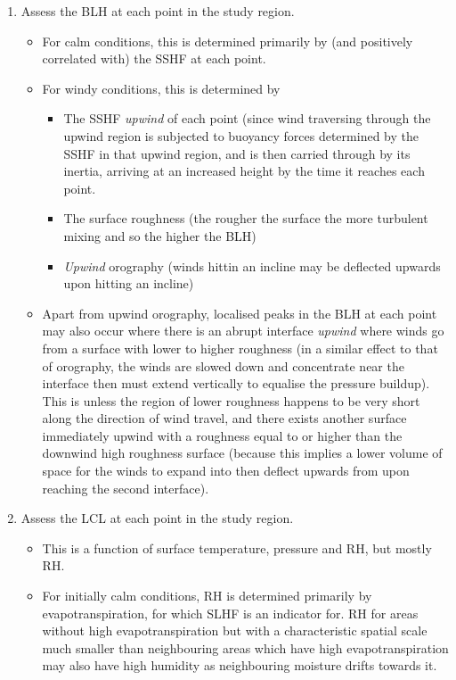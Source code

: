 \begin{enumerate}
	\item Assess the \ac{BLH} at each point in the study region.
	\begin{itemize}
		\item For calm conditions, this is determined primarily by (and positively correlated with) the \ac{SSHF} at each point.
		\item For windy conditions, this is determined by
		\begin{itemize}
			\item The \ac{SSHF} \textit{upwind} of each point (since wind traversing through the upwind region is subjected to buoyancy forces determined by the \ac{SSHF} in that upwind region, and is then carried through by its inertia, arriving at an increased height by the time it reaches each point.
			\item The surface roughness (the rougher the surface the more turbulent mixing and so the higher the \ac{BLH})
			\item \textit{Upwind} orography (winds hittin an incline may be deflected upwards upon hitting an incline)
		\end{itemize}
		\item Apart from upwind orography, localised peaks in the \ac{BLH} at each point may also occur where there is an abrupt interface \textit{upwind} where winds go from a surface with lower to higher roughness (in a similar effect to that of orography, the winds are slowed down and concentrate near the interface then must extend vertically to equalise the pressure buildup). This is unless the region of lower roughness happens to be very short along the direction of wind travel, and there exists another surface immediately upwind with a roughness equal to or higher than the downwind high roughness surface (because this implies a lower volume of space for the winds to expand into then deflect upwards from upon reaching the second interface).
		\end{itemize}
	\item Assess the \ac{LCL} at each point in the study region.
	\begin{itemize}
		\item This is a function of surface temperature, pressure and \ac{RH}, but mostly \ac{RH}.
		\item For initially calm conditions, \ac{RH} is determined primarily by evapotranspiration, for which \ac{SLHF} is an indicator for. \ac{RH} for areas without high evapotranspiration but with a characteristic spatial scale much smaller than neighbouring areas which have high evapotranspiration may also have high humidity as neighbouring moisture drifts towards it.

\end{itemize}
\end{enumerate}
